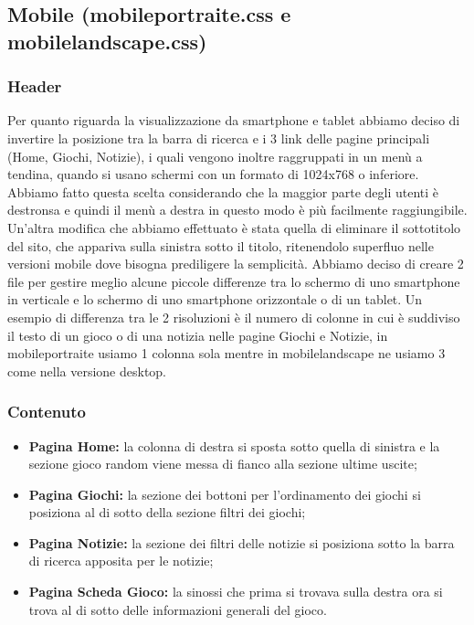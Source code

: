 \subsection{Mobile (mobileportraite.css e mobilelandscape.css)}

\subsubsection{Header}
Per quanto riguarda la visualizzazione da smartphone e tablet abbiamo deciso di invertire la posizione tra la barra di ricerca e i 3 link delle pagine principali (Home, Giochi, Notizie), i quali vengono inoltre raggruppati in un menù a tendina, quando si usano schermi con un formato di 1024x768 o inferiore. Abbiamo fatto questa scelta considerando che la maggior parte degli utenti è destronsa e quindi il menù a destra in questo modo è più facilmente raggiungibile. Un’altra modifica che abbiamo effettuato è stata quella di eliminare il sottotitolo del sito, che appariva sulla sinistra sotto il titolo, ritenendolo superfluo nelle versioni mobile dove bisogna prediligere la semplicità.
Abbiamo deciso di creare 2 file per gestire meglio alcune piccole differenze tra lo schermo di uno smartphone in verticale e lo schermo di uno smartphone orizzontale o di un tablet. Un esempio di differenza tra le 2 risoluzioni è il numero di colonne in cui è suddiviso il testo di un gioco o di una notizia nelle pagine Giochi e Notizie, in mobileportraite usiamo 1 colonna sola mentre in mobilelandscape ne usiamo 3 come nella versione desktop.


\subsubsection{Contenuto}
\begin{itemize}
	\item \textbf{Pagina Home:} la colonna di destra si sposta sotto quella di sinistra e la sezione gioco random viene messa di fianco alla sezione ultime uscite;
	\item \textbf{Pagina Giochi:} la sezione dei bottoni per l’ordinamento dei giochi si posiziona al di sotto della sezione filtri dei giochi;
	\item \textbf{Pagina Notizie:} la sezione dei filtri delle notizie si posiziona sotto la barra di ricerca apposita per le notizie;
	\item \textbf{Pagina Scheda Gioco:} la sinossi che prima si trovava sulla destra ora si trova al di sotto delle informazioni generali del gioco.
\end{itemize}


